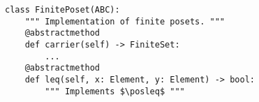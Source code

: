 \begin{verbatim}
class FinitePoset(ABC):
    """ Implementation of finite posets. """
    @abstractmethod
    def carrier(self) -> FiniteSet:
        ...
    @abstractmethod
    def leq(self, x: Element, y: Element) -> bool:
        """ Implements $\posleq$ """
\end{verbatim}